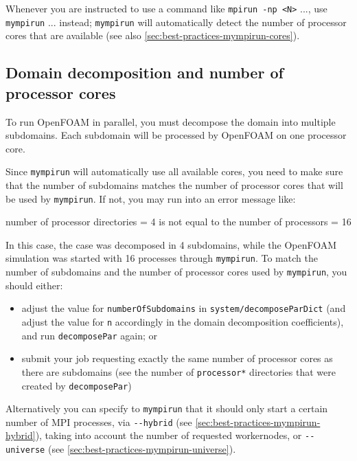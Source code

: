\begin{prompt}
\end{prompt}

Whenever you are instructed to use a command like \lstinline|mpirun -np <N>| ...,
use \lstinline|mympirun| ... instead; \lstinline|mympirun| will automatically detect the number of
processor cores that are available (see also \autoref{sec:best-practices-mympirun-cores}).

\subsection{Domain decomposition and number of processor cores}
\label{sec:best-practices-openfoam-domain-decomposition-processor-cores}

To run OpenFOAM in parallel, you must decompose the domain into multiple subdomains.
Each subdomain will be processed by OpenFOAM on one processor core.

Since \lstinline|mympirun| will automatically use all available cores, you need to make sure
that the number of subdomains matches the number of processor cores that will be used by \lstinline|mympirun|.
If not, you may run into an error message like:

\begin{prompt}
number of processor directories = 4 is not equal to the number of processors = 16
\end{prompt}

In this case, the case was decomposed in 4 subdomains, while the OpenFOAM simulation was started with 16 processes
through \lstinline|mympirun|.
To match the number of subdomains and the number of processor cores used by \lstinline|mympirun|,
you should either:

\begin{itemize}
\item adjust the value for \lstinline|numberOfSubdomains| in \lstinline|system/decomposeParDict|
    (and adjust the value for \lstinline|n| accordingly in the domain decomposition coefficients),
    and run \lstinline|decomposePar| again; or
\item submit your job requesting exactly the same number of processor cores as there are subdomains (see the
    number of \lstinline|processor*| directories that were created by \lstinline|decomposePar|)
\end{itemize}

Alternatively you can specify to \texttt{mympirun} that it should only start a certain number of MPI processes,
via \lstinline|--hybrid| (see \autoref{sec:best-practices-mympirun-hybrid}),
taking into account the number of requested workernodes,
or \lstinline|--universe| (see \autoref{sec:best-practices-mympirun-universe}).

